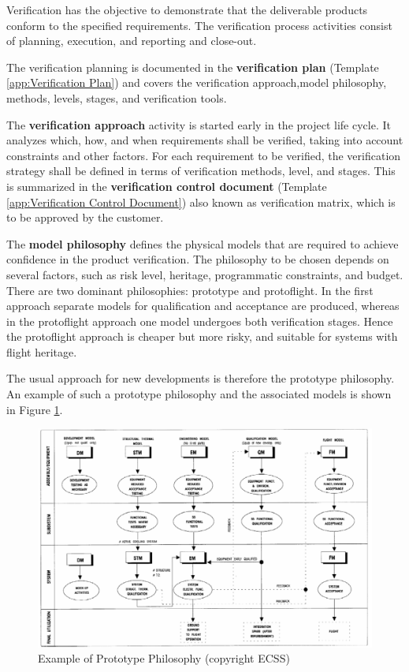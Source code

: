 Verification has the objective to demonstrate that the deliverable products conform to the specified requirements. The verification process activities consist of planning, execution, and reporting and close-out. 

The verification planning is documented in the \textbf{verification plan} (Template \ref{app:Verification Plan}) and covers the verification approach,model philosophy, methods, levels, stages, and verification tools. 

The \textbf{verification approach} activity is started early in the project life cycle. It analyzes which, how, and when requirements shall be verified, taking into account constraints and other factors. For each requirement to be verified, the verification strategy shall be defined in terms of verification methods, level, and stages. This is summarized in the \textbf{verification control document} (Template \ref{app:Verification Control Document}) also known as verification matrix, which is to be approved by the customer.

The \textbf{model philosophy} defines the physical models that are required to achieve confidence in the product verification. The philosophy to be chosen depends on several factors, such as risk level, heritage, programmatic constraints, and budget. There are two dominant philosophies: prototype and protoflight. In the first approach separate models for qualification and acceptance are produced, whereas in the protoflight approach one model undergoes both verification stages. Hence the protoflight approach is cheaper but more risky, and suitable for systems with flight heritage.

The usual approach for new developments is therefore the prototype philosophy. An example of such a prototype philosophy and the associated models is shown in Figure \ref{fig:Example of Prototype Philosophy}.

\begin{figure}[h]
\centering\includegraphics[scale=0.4]{fig/example_of_prototype_philosophy}
\caption{Example of Prototype Philosophy (copyright ECSS)}
\label{fig:Example of Prototype Philosophy}
\end{figure}

